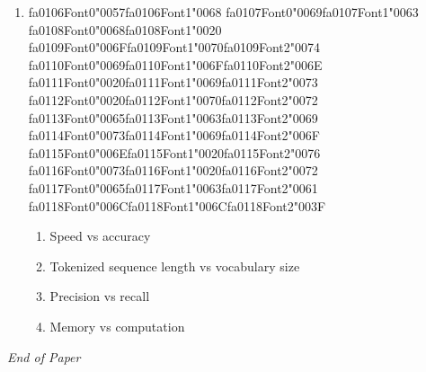 \documentclass[12pt]{article}
\begin{document}
\begin{enumerate}[label=Q\arabic*.]
\item {\csname fa0106Font0\endcsname\char"0057}{\csname fa0106Font1\endcsname\char"0068} {\csname fa0107Font0\endcsname\char"0069}{\csname fa0107Font1\endcsname\char"0063} {\csname fa0108Font0\endcsname\char"0068}{\csname fa0108Font1\endcsname\char"0020} {\csname fa0109Font0\endcsname\char"006F}{\csname fa0109Font1\endcsname\char"0070}{\csname fa0109Font2\endcsname\char"0074} {\csname fa0110Font0\endcsname\char"0069}{\csname fa0110Font1\endcsname\char"006F}{\csname fa0110Font2\endcsname\char"006E} {\csname fa0111Font0\endcsname\char"0020}{\csname fa0111Font1\endcsname\char"0069}{\csname fa0111Font2\endcsname\char"0073} {\csname fa0112Font0\endcsname\char"0020}{\csname fa0112Font1\endcsname\char"0070}{\csname fa0112Font2\endcsname\char"0072} {\csname fa0113Font0\endcsname\char"0065}{\csname fa0113Font1\endcsname\char"0063}{\csname fa0113Font2\endcsname\char"0069} {\csname fa0114Font0\endcsname\char"0073}{\csname fa0114Font1\endcsname\char"0069}{\csname fa0114Font2\endcsname\char"006F} {\csname fa0115Font0\endcsname\char"006E}{\csname fa0115Font1\endcsname\char"0020}{\csname fa0115Font2\endcsname\char"0076} {\csname fa0116Font0\endcsname\char"0073}{\csname fa0116Font1\endcsname\char"0020}{\csname fa0116Font2\endcsname\char"0072} {\csname fa0117Font0\endcsname\char"0065}{\csname fa0117Font1\endcsname\char"0063}{\csname fa0117Font2\endcsname\char"0061} {\csname fa0118Font0\endcsname\char"006C}{\csname fa0118Font1\endcsname\char"006C}{\csname fa0118Font2\endcsname\char"003F}
\begin{enumerate}[label=(\Alph*)]
    \item Speed vs accuracy
    \item Tokenized sequence length vs vocabulary size
    \item Precision vs recall
    \item Memory vs computation
\end{enumerate}
\end{enumerate}

\vfill
\noindent\textit{End of Paper}
\end{document}
